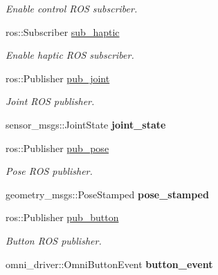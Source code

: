 \begin{DoxyCompactItemize}
\begin{DoxyCompactList}\small\item\em Enable control R\-O\-S subscriber. \end{DoxyCompactList}\item 
\hypertarget{classOmniBase_a60598eb25c3e6a1167fcbbdae581f1a5}{ros\-::\-Subscriber \hyperlink{classOmniBase_a60598eb25c3e6a1167fcbbdae581f1a5}{sub\-\_\-haptic}}\label{classOmniBase_a60598eb25c3e6a1167fcbbdae581f1a5}

\begin{DoxyCompactList}\small\item\em Enable haptic R\-O\-S subscriber. \end{DoxyCompactList}\item 
\hypertarget{classOmniBase_a610f935950307a0395c07d36313809b7}{ros\-::\-Publisher \hyperlink{classOmniBase_a610f935950307a0395c07d36313809b7}{pub\-\_\-joint}}\label{classOmniBase_a610f935950307a0395c07d36313809b7}

\begin{DoxyCompactList}\small\item\em Joint R\-O\-S publisher. \end{DoxyCompactList}\item 
\hypertarget{classOmniBase_ac4302b7badb135c465b71cb2d67b1a85}{sensor\-\_\-msgs\-::\-Joint\-State {\bfseries joint\-\_\-state}}\label{classOmniBase_ac4302b7badb135c465b71cb2d67b1a85}

\item 
\hypertarget{classOmniBase_ad8d0103682a01ed2a635f6aa01fb0124}{ros\-::\-Publisher \hyperlink{classOmniBase_ad8d0103682a01ed2a635f6aa01fb0124}{pub\-\_\-pose}}\label{classOmniBase_ad8d0103682a01ed2a635f6aa01fb0124}

\begin{DoxyCompactList}\small\item\em Pose R\-O\-S publisher. \end{DoxyCompactList}\item 
\hypertarget{classOmniBase_a0e3d2a98eb5be64e37dcce8939b99fe8}{geometry\-\_\-msgs\-::\-Pose\-Stamped {\bfseries pose\-\_\-stamped}}\label{classOmniBase_a0e3d2a98eb5be64e37dcce8939b99fe8}

\item 
\hypertarget{classOmniBase_a1cbe27fd9e63d07a9875e82a581bfab5}{ros\-::\-Publisher \hyperlink{classOmniBase_a1cbe27fd9e63d07a9875e82a581bfab5}{pub\-\_\-button}}\label{classOmniBase_a1cbe27fd9e63d07a9875e82a581bfab5}

\begin{DoxyCompactList}\small\item\em Button R\-O\-S publisher. \end{DoxyCompactList}\item 
\hypertarget{classOmniBase_aad994dc88b576231e3f37c11f510b319}{omni\-\_\-driver\-::\-Omni\-Button\-Event {\bfseries button\-\_\-event}}\label{classOmniBase_aad994dc88b576231e3f37c11f510b319}


\end{DoxyCompactItemize}
